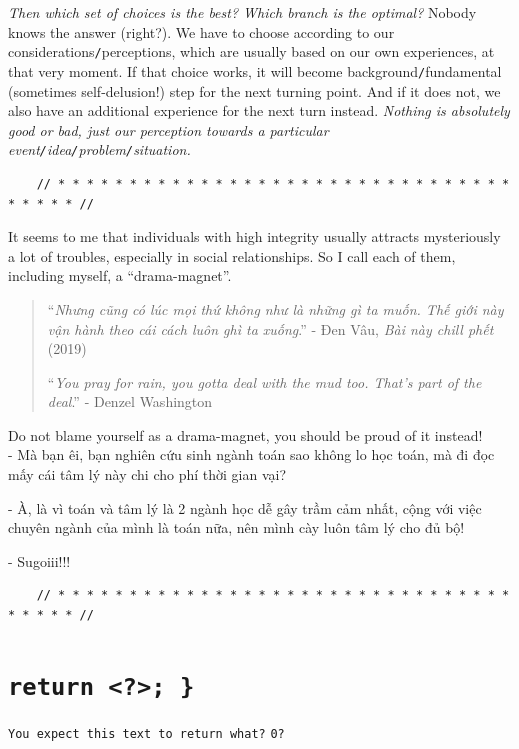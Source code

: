 \documentclass[12pt]{article}
\numberwithin{equation}{section}
\begin{document}
\textit{Then which set of choices is the best? Which branch is the optimal?} Nobody knows the answer (right?). We have to choose according to our considerations\texttt{/}perceptions, which are usually based on our own experiences, at that very moment. If that choice works, it will become background\texttt{/}fundamental (sometimes self-delusion!) step for the next turning point. And if it does not, we also have an additional experience for the next turn instead. \textit{Nothing is absolutely good or bad, just our perception towards a particular event\texttt{/}idea\texttt{/}problem\texttt{/}situation.}

\begin{verbatim}
    // * * * * * * * * * * * * * * * * * * * * * * * * * * * * * * * * * * * * * //
\end{verbatim}

\noindent
{} It seems to me that individuals with high integrity usually attracts mysteriously a lot of troubles, especially in social relationships. So I call each of them, including myself, a ``drama-magnet''.

\begin{quotation}
    ``\textit{Nhưng cũng có lúc mọi thứ không như là những gì ta muốn. Thế giới này vận hành theo cái cách luôn ghì ta xuống}.'' - Đen Vâu, \textit{Bài này chill phết} (2019)
    
    ``\textit{You pray for rain, you gotta deal with the mud too. That's part of the deal}.'' - Denzel Washington
\end{quotation}
Do not blame yourself as a drama-magnet, you should be proud of it instead!
\\

- Mà bạn êi, bạn nghiên cứu sinh ngành toán sao không lo học toán, mà đi đọc mấy cái tâm lý này chi cho phí thời gian vại?

- À, là vì toán và tâm lý là 2 ngành học dễ gây trầm cảm nhất, cộng với việc chuyên ngành của mình là toán nữa, nên mình cày luôn tâm lý cho đủ bộ!

- Sugoiii!!!

\begin{verbatim}
    // * * * * * * * * * * * * * * * * * * * * * * * * * * * * * * * * * * * * * //
\end{verbatim}

\section{\texttt{{\color{RubineRed}return} {\color{Purple}<?>}; \}}}
\texttt{\small You expect this text to return what?} \texttt{0?}
\end{document}
